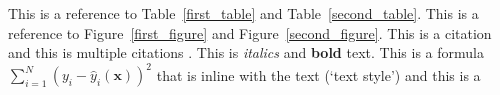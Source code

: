 \documentclass[10pt,twocolumn,letterpaper]{article}
\begin{document}


This is a reference to Table~\ref{first_table} and Table~\ref{second_table}.
This is a reference to Figure~\ref{first_figure} and Figure~\ref{second_figure}.
This is a citation \cite{breiman2001statistical} and this is
multiple citations \cite{breiman2001statistical,bishop2006pattern}.
This is \textit{italics} and \textbf{bold} text.
This is a formula $\sum_{i=1}^N (y_i - \hat{y}_i(\mathbf{x}))^2$
that is inline with the text (`text style') and this is a
\end{document}

